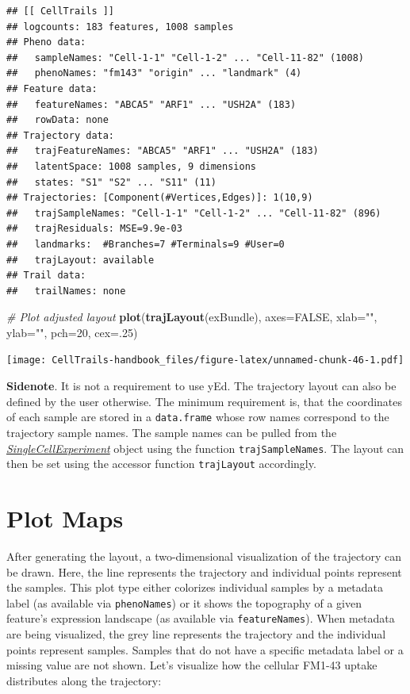 \documentclass[]{book}
\newenvironment{Shaded}{\begin{snugshade}}{\end{snugshade}}
\newcommand{\KeywordTok}[1]{\textcolor[rgb]{0.13,0.29,0.53}{\textbf{#1}}}
\newcommand{\DataTypeTok}[1]{\textcolor[rgb]{0.13,0.29,0.53}{#1}}
\newcommand{\DecValTok}[1]{\textcolor[rgb]{0.00,0.00,0.81}{#1}}
\newcommand{\StringTok}[1]{\textcolor[rgb]{0.31,0.60,0.02}{#1}}
\newcommand{\CommentTok}[1]{\textcolor[rgb]{0.56,0.35,0.01}{\textit{#1}}}
\newcommand{\OtherTok}[1]{\textcolor[rgb]{0.56,0.35,0.01}{#1}}
\newcommand{\NormalTok}[1]{#1}
\theoremstyle{definition}
\theoremstyle{definition}
\theoremstyle{definition}
\theoremstyle{remark}
\begin{document}
\begin{verbatim}
## [[ CellTrails ]] 
## logcounts: 183 features, 1008 samples
## Pheno data: 
##   sampleNames: "Cell-1-1" "Cell-1-2" ... "Cell-11-82" (1008)
##   phenoNames: "fm143" "origin" ... "landmark" (4)
## Feature data: 
##   featureNames: "ABCA5" "ARF1" ... "USH2A" (183)
##   rowData: none
## Trajectory data: 
##   trajFeatureNames: "ABCA5" "ARF1" ... "USH2A" (183)
##   latentSpace: 1008 samples, 9 dimensions
##   states: "S1" "S2" ... "S11" (11)
## Trajectories: [Component(#Vertices,Edges)]: 1(10,9)
##   trajSampleNames: "Cell-1-1" "Cell-1-2" ... "Cell-11-82" (896)
##   trajResiduals: MSE=9.9e-03
##   landmarks:  #Branches=7 #Terminals=9 #User=0
##   trajLayout: available
## Trail data: 
##   trailNames: none
\end{verbatim}

\begin{Shaded}
\begin{Highlighting}[]
\CommentTok{# Plot adjusted layout}
\KeywordTok{plot}\NormalTok{(}\KeywordTok{trajLayout}\NormalTok{(exBundle), }\DataTypeTok{axes=}\OtherTok{FALSE}\NormalTok{, }\DataTypeTok{xlab=}\StringTok{""}\NormalTok{, }\DataTypeTok{ylab=}\StringTok{""}\NormalTok{, }\DataTypeTok{pch=}\DecValTok{20}\NormalTok{, }\DataTypeTok{cex=}\NormalTok{.}\DecValTok{25}\NormalTok{)}
\end{Highlighting}
\end{Shaded}

\texttt{[image: CellTrails-handbook\_files/figure-latex/unnamed-chunk-46-1.pdf]}

\textbf{Sidenote}. It is not a requirement to use yEd. The trajectory
layout can also be defined by the user otherwise. The minimum
requirement is, that the coordinates of each sample are stored in a
\texttt{data.frame} whose row names correspond to the trajectory sample
names. The sample names can be pulled from the
\emph{\href{http://bioconductor.org/packages/SingleCellExperiment}{SingleCellExperiment}}
object using the function \texttt{trajSampleNames}. The layout can then
be set using the accessor function \texttt{trajLayout} accordingly.

\section{Plot Maps}\label{plot-maps}

After generating the layout, a two-dimensional visualization of the
trajectory can be drawn. Here, the line represents the trajectory and
individual points represent the samples. This plot type either colorizes
individual samples by a metadata label (as available via
\texttt{phenoNames}) or it shows the topography of a given feature's
expression landscape (as available via \texttt{featureNames}). When
metadata are being visualized, the grey line represents the trajectory
and the individual points represent samples. Samples that do not have a
specific metadata label or a missing value are not shown. Let's
visualize how the cellular FM1-43 uptake distributes along the
trajectory:
\end{document}
